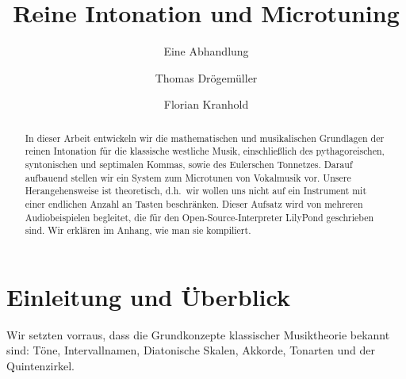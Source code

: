 \documentclass[ngerman,11pt]{scrartcl}
\title     {Reine Intonation und Microtuning}
\author    {Thomas Drögemüller\and Florian Kranhold}
\subtitle  {Eine Abhandlung}
\begin{document}
\maketitle

\begin{abstract}
  In dieser Arbeit entwickeln wir die mathematischen und musikalischen
  Grundlagen  der reinen Intonation für die klassische westliche Musik,
  einschließlich des pythagoreischen, syntonischen und septimalen Kommas, sowie
  des Eulerschen Tonnetzes. Darauf aufbauend stellen wir ein System zum
  Microtunen von Vokalmusik vor. Unsere Herangehensweise ist theoretisch,
  d.h.\ wir wollen uns nicht auf ein Instrument mit einer endlichen Anzahl an
  Tasten beschränken. Dieser Aufsatz wird von mehreren Audiobeispielen
  begleitet, die für den Open-Source-Interpreter LilyPond geschrieben sind. Wir
  erklären im Anhang, wie man sie kompiliert.
\end{abstract}

\section{Einleitung und Überblick}
\label{sec:int}

Wir setzten vorraus, dass die Grundkonzepte klassischer
Musiktheorie bekannt sind: Töne, Intervallnamen, Diatonische Skalen, Akkorde,
Tonarten und der Quintenzirkel.
\end{document}
